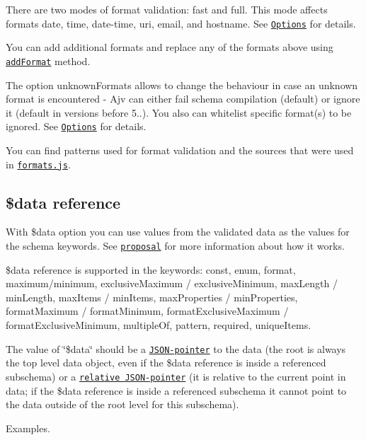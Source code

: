 There are two modes of format validation\+: {\ttfamily fast} and {\ttfamily full}. This mode affects formats {\ttfamily date}, {\ttfamily time}, {\ttfamily date-\/time}, {\ttfamily uri}, {\ttfamily email}, and {\ttfamily hostname}. See \href{#options}{\tt Options} for details.

You can add additional formats and replace any of the formats above using \href{#api-addformat}{\tt add\+Format} method.

The option {\ttfamily unknown\+Formats} allows to change the behaviour in case an unknown format is encountered -\/ Ajv can either fail schema compilation (default) or ignore it (default in versions before 5..). You also can whitelist specific format(s) to be ignored. See \href{#options}{\tt Options} for details.

You can find patterns used for format validation and the sources that were used in \href{https://github.com/epoberezkin/ajv/blob/master/lib/compile/formats.js}{\tt formats.\+js}.

\subsection*{\$data reference}

With {\ttfamily \$data} option you can use values from the validated data as the values for the schema keywords. See \href{https://github.com/json-schema/json-schema/wiki/$data-(v5-proposal)}{\tt proposal} for more information about how it works.

{\ttfamily \$data} reference is supported in the keywords\+: const, enum, format, maximum/minimum, exclusive\+Maximum / exclusive\+Minimum, max\+Length / min\+Length, max\+Items / min\+Items, max\+Properties / min\+Properties, format\+Maximum / format\+Minimum, format\+Exclusive\+Maximum / format\+Exclusive\+Minimum, multiple\+Of, pattern, required, unique\+Items.

The value of \char`\"{}\$data\char`\"{} should be a \href{https://tools.ietf.org/html/rfc6901}{\tt J\+S\+O\+N-\/pointer} to the data (the root is always the top level data object, even if the \$data reference is inside a referenced subschema) or a \href{http://tools.ietf.org/html/draft-luff-relative-json-pointer-00}{\tt relative J\+S\+O\+N-\/pointer} (it is relative to the current point in data; if the \$data reference is inside a referenced subschema it cannot point to the data outside of the root level for this subschema).

Examples.

